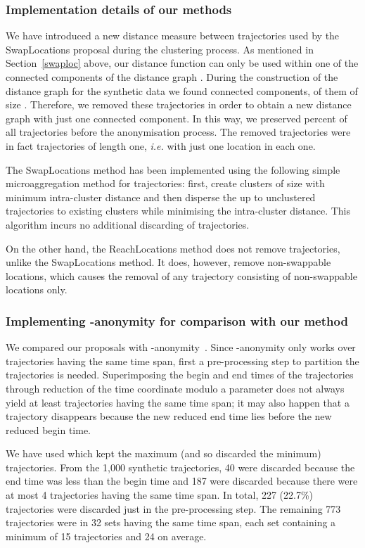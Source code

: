 \subsubsection{Implementation details of our methods}

We have introduced a new distance measure between trajectories used by
the SwapLocations proposal during the clustering process.
As mentioned in Section~\ref{swaploc} above,
our distance function can only be used
within one of the connected components of the distance graph .
During the construction of
the distance graph for the synthetic data we found  connected
components,  of them of size . Therefore, we removed these 
trajectories in order to obtain a new distance graph with just one connected
component. In this way, we preserved  percent of all
trajectories before the anonymisation process. The
removed trajectories were in fact trajectories of length one, {\em i.e.}
with just one location in each one.

The SwapLocations method has been implemented using the
following simple microaggregation method for trajectories:
first, create clusters of  size  with minimum
intra-cluster distance and then disperse the up to 
unclustered trajectories to existing
clusters while minimising the intra-cluster distance. This algorithm incurs
no additional discarding of trajectories.

On the other hand, the ReachLocations method
does not remove trajectories, unlike the SwapLocations method.
It does, however, remove non-swappable locations, which
causes the removal of any trajectory consisting of
non-swappable locations only.

\subsubsection{Implementing -anonymity for comparison with
our method}

We compared our proposals with -anonymity~\cite{abul08}. Since
-anonymity only works over trajectories having the same
time span, first a pre-processing step to partition the trajectories is
needed. Superimposing the begin and end times of the trajectories
through reduction of the time coordinate modulo a parameter
 does not always yield
at least  trajectories having the same time span; it may also happen that a
trajectory disappears because the new reduced end time lies before the new
reduced begin time.

We have used  which kept the maximum (and so discarded the minimum)
trajectories. From the 1,000 synthetic trajectories, 40 were discarded because
the end time was less than the begin time and 187 were discarded because
there were at most 4 trajectories having the same time span. In total, 227
(22.7\%) trajectories were discarded just in the pre-processing step. The
remaining 773 trajectories were in 32 sets having the same time span, each
set containing a minimum of 15 trajectories and 24 on average.

